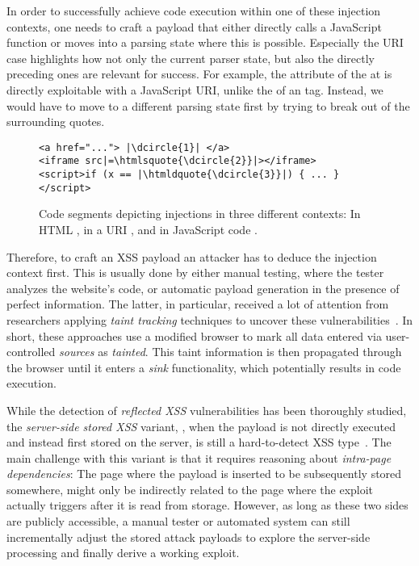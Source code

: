 In order to successfully achieve code execution within one of these injection contexts, one needs to craft a payload that either directly calls a JavaScript function or moves into a parsing state where this is possible.
Especially the URI case highlights how not only the current parser state, but also the directly preceding ones are relevant for success.
For example, the  attribute of the  at  is directly exploitable with a JavaScript URI, unlike the  of an  tag.
Instead, we would have to move to a different parsing state first by trying to break out of the surrounding quotes.

\begin{figure}[htb]
\begin{verbatim}
<a href="..."> |\dcircle{1}| </a>
<iframe src|=\htmlsquote{\dcircle{2}}|></iframe>
<script>if (x == |\htmldquote{\dcircle{3}}|) { ... }</script>
\end{verbatim}

\caption{Code segments depicting injections in three different contexts: In HTML , in a URI , and in JavaScript code .}\label{fig:xss-contexts}
\end{figure}

Therefore, to craft an XSS payload an attacker has to deduce the injection context first.
This is usually done by either manual testing, where the tester analyzes the website's code, or automatic payload generation in the presence of perfect information.
The latter, in particular, received a lot of attention from researchers applying \emph{taint tracking} techniques to uncover these vulnerabilities~\cite{LekStoJoh13, StoPfiKaiLek+15, MelDasShaBau+18, SteRosJohSto+19, KleBarBen+22}.
In short, these approaches use a modified browser to mark all data entered via user-controlled \emph{sources} as \emph{tainted}.
This taint information is then propagated through the browser until it enters a \emph{sink} functionality, which potentially results in code execution.%

While the detection of \emph{reflected XSS} vulnerabilities has been thoroughly studied, the \emph{server-side stored XSS} variant, \ie, when the payload is not directly executed and instead first stored on the server, is still a hard-to-detect XSS type~\cite{eriksson2021black}.
The main challenge with this variant is that it requires reasoning about \emph{intra-page dependencies}: The page where the payload is inserted to be subsequently stored somewhere, might only be indirectly related to the page where the exploit actually triggers after it is read from storage.
However, as long as these two sides are publicly accessible, a manual tester or automated system can still incrementally adjust the stored attack payloads to explore the server-side processing and finally derive a working exploit.

